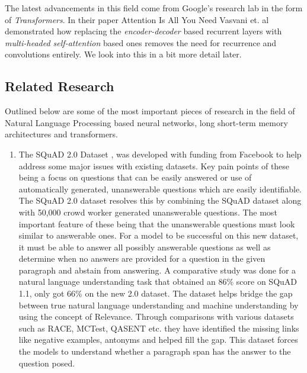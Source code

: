 \documentclass[11pt]{article}
\begin{document}
	The latest advancements in this field come from Google's research lab in the form of \textit{Transformers}. In their paper Attention Is All You Need\citep{atayl} Vasvani et. al demonstrated how replacing the \textit{encoder-decoder} based recurrent layers with \textit{multi-headed self-attention} based ones removes the need for recurrence and convolutions entirely. We look into this in a bit more detail later.

	\subsection{Related Research}\label{rr}
	Outlined below are some of the most important pieces of research in the field of Natural Language Processing based neural networks, long short-term memory architectures and transformers.
	\begin{enumerate}
		\item The SQuAD 2.0 Dataset \citep{dataset}, was developed with funding from Facebook to help address some major issues with existing datasets. Key pain points of these being a focus on questions that can be easily answered or use of automatically generated, unanswerable questions which are easily identifiable.\\
		The SQuAD 2.0 dataset resolves this by combining the SQuAD dataset along with 50,000 crowd worker generated unanswerable questions. The most important feature of these being that the unanswerable questions must look similar to answerable ones. For a model to be successful on this new dataset, it must be able to answer all possibly answerable questions as well as determine when no answers are provided for a question in the given paragraph and abstain from answering. A comparative study was done for a natural language understanding task that obtained an 86\% score on SQuAD 1.1, only got 66\% on the new 2.0 dataset.
		The dataset helps bridge the gap between true natural language understanding and machine understanding by using the concept of Relevance. Through comparisons with various datasets such as RACE, MCTest, QASENT etc. they have identified the missing links like negative examples, antonyms and helped fill the gap. This dataset forces the models to understand whether a paragraph span has the answer to the question posed.


\end{enumerate}
\end{document}
